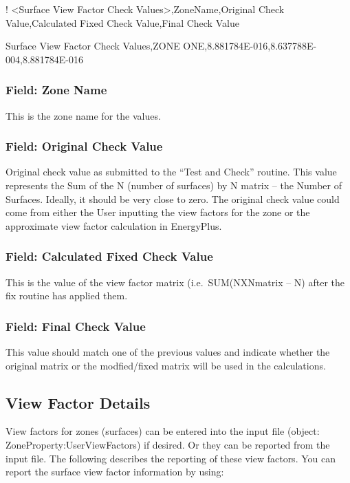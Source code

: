 ! \textless{}Surface View Factor Check Values\textgreater{},ZoneName,Original Check Value,Calculated Fixed Check Value,Final Check Value

Surface View Factor Check Values,ZONE ONE,8.881784E-016,8.637788E-004,8.881784E-016

\subsubsection{Field: Zone Name}\label{field-zone-name-15}

This is the zone name for the values.

\subsubsection{Field: Original Check Value}\label{field-original-check-value}

Original check value as submitted to the ``Test and Check'' routine. This value represents the Sum of the N (number of surfaces) by N matrix -- the Number of Surfaces. Ideally, it should be very close to zero. The original check value could come from either the User inputting the view factors for the zone or the approximate view factor calculation in EnergyPlus.

\subsubsection{Field: Calculated Fixed Check Value}\label{field-calculated-fixed-check-value}

This is the value of the view factor matrix (i.e.~SUM(NXNmatrix -- N) after the fix routine has applied them.

\subsubsection{Field: Final Check Value}\label{field-final-check-value}

This value should match one of the previous values and indicate whether the original matrix or the modfied/fixed matrix will be used in the calculations.

\subsection{View Factor Details}\label{view-factor-details}

View factors for zones (surfaces) can be entered into the input file (object: ZoneProperty:UserViewFactors) if desired. Or they can be reported from the input file. The following describes the reporting of these view factors. You can report the surface view factor information by using:

